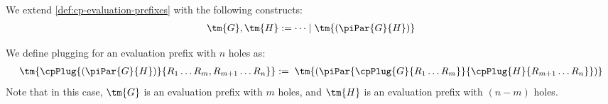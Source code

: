 \begin{definition}\label{def:hcp-evaluation-prefixes}
  We extend \cref{def:cp-evaluation-prefixes} with the following constructs:
  \begin{align*}
    \tm{G}, \tm{H} := \dots \mid \tm{(\piPar{G}{H})}
  \end{align*}
\end{definition}
\begin{definition}[Plugging]\label{def:hcp-evaluation-prefix-plugging}
  We define plugging for an evaluation prefix with $n$ holes as:
  \begin{gather*}
    \begin{array}{l}
      \tm{\cpPlug{(\piPar{G}{H})}{R_1 \dots R_m, R_{m+1} \dots R_{n}}}
      := \; \tm{(\piPar{\cpPlug{G}{R_1 \dots R_m}}{\cpPlug{H}{R_{m+1} \dots R_n}})}
    \end{array}
  \end{gather*}
  Note that in this case, $\tm{G}$ is an evaluation prefix with $m$ holes,
  and $\tm{H}$ is an evaluation prefix with $(n-m)$ holes.
\end{definition}
